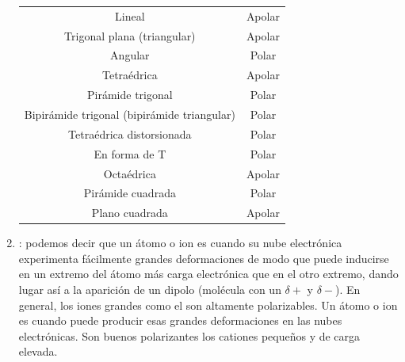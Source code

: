 \begin{enumerate}[label=\numberballmDarkTeal]
\begin{longtable}{@{}cc@{}}
            \midrule
            \endhead
            \bottomrule
            \endlastfoot
            Lineal & Apolar \\[3pt]
            Trigonal plana (triangular) & Apolar \\[3pt]
            Angular & Polar \\[3pt]
            Tetraédrica & Apolar \\[3pt]
            Pirámide trigonal & Polar \\[3pt]
            Bipirámide trigonal (bipirámide triangular) & Polar \\[3pt]
            Tetraédrica distorsionada & Polar \\[3pt]
            En forma de T & Polar \\[3pt]
            Octaédrica & Apolar \\[3pt]
            Pirámide cuadrada & Polar \\[3pt]
            Plano cuadrada & Apolar \\
        \end{longtable}



        \item {}: podemos decir que un átomo o ion es  cuando su nube electrónica experimenta fácilmente grandes deformaciones de modo que puede inducirse en un extremo del átomo más carga electrónica que en el otro extremo, dando lugar así a la aparición de un dipolo (molécula con un $\delta +$ y $\delta -$). En general, los iones grandes como el  son altamente polarizables.
        Un átomo o ion es  cuando puede producir esas grandes deformaciones en las nubes electrónicas.
        Son buenos polarizantes los cationes pequeños y de carga elevada.
\end{enumerate}

